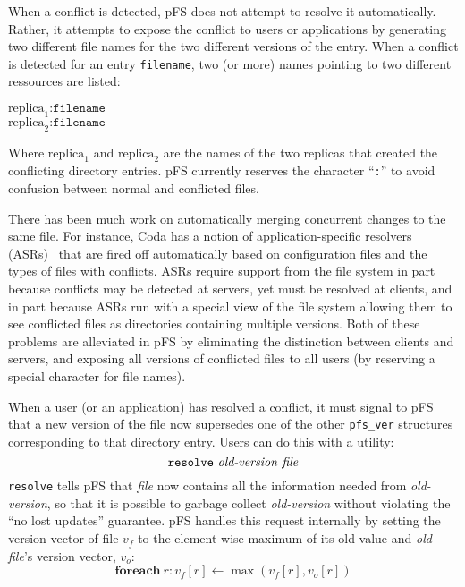 When a conflict is detected, pFS does not attempt to resolve it
automatically.  Rather, it attempts to expose the conflict to users or
applications by generating two different file names for the two
different versions of the entry. When a conflict is detected for an
entry \texttt{filename}, two (or more) names pointing to two different
ressources are listed:
\begin{center}
{\tt $\mathrm{replica}_1\texttt{:filename}$} \\
{\tt $\mathrm{replica}_2\texttt{:filename}$} \\
\end{center}
Where $\mathrm{replica}_1$ and $\mathrm{replica}_2$ are the names of
the two replicas that created the conflicting directory entries.  pFS
currently reserves the character ``\texttt{:}'' to avoid confusion
between normal and conflicted files.

There has been much work on automatically merging concurrent changes
to the same file.  For instance, Coda has a notion of
application-specific resolvers (ASRs)~\cite{kumar:conflict} that are
fired off automatically based on configuration files and the types of
files with conflicts.  ASRs require support from the file system in
part because conflicts may be detected at servers, yet must be
resolved at clients, and in part because ASRs run with a special view
of the file system allowing them to see conflicted files as
directories containing multiple versions.  Both of these problems are
alleviated in pFS by eliminating the distinction between clients and
servers, and exposing all versions of conflicted files to all users
(by reserving a special character for file names).

When a user (or an application) has resolved a conflict, it must
signal to pFS that a new version of the file now supersedes one of the
other \texttt{pfs\_ver} structures corresponding to that directory
entry.  Users can do this with a utility:
$$\mbox{\texttt{resolve} \emph{old-version} \emph{file}}$$
\texttt{resolve} tells pFS that \emph{file} now contains all the
information needed from \emph{old-version}, so that it is possible to
garbage collect \emph{old-version} without violating the ``no lost
updates'' guarantee.  pFS handles this request internally by setting
the version vector of file $v_f$ to the element-wise maximum of its
old value and \emph{old-file}'s version vector, $v_o$:
$$\mathbf{foreach}\>r:v_f[r]\gets\max(v_f[r],v_o[r])$$


